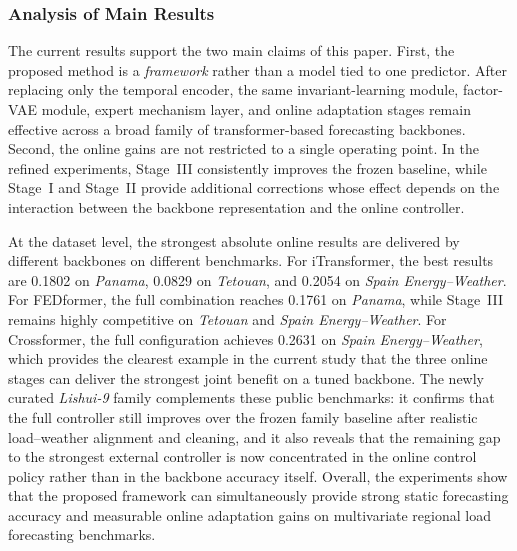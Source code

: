 ﻿\documentclass[journal]{IEEEtran}
\newenvironment{auditproblemblock}{\begingroup\color{red}}{\endgroup}
\begin{document}
\subsubsection{Analysis of Main Results}
\begin{auditproblemblock}
The current results support the two main claims of this paper. First, the proposed method is a \emph{framework} rather than a model tied to one predictor. After replacing only the temporal encoder, the same invariant-learning module, factor-VAE module, expert mechanism layer, and online adaptation stages remain effective across a broad family of transformer-based forecasting backbones. Second, the online gains are not restricted to a single operating point. In the refined experiments, Stage~III consistently improves the frozen baseline, while Stage~I and Stage~II provide additional corrections whose effect depends on the interaction between the backbone representation and the online controller.

At the dataset level, the strongest absolute online results are delivered by different backbones on different benchmarks. For iTransformer, the best results are 0.1802 on \textit{Panama}, 0.0829 on \textit{Tetouan}, and 0.2054 on \textit{Spain Energy--Weather}. For FEDformer, the full combination reaches 0.1761 on \textit{Panama}, while Stage~III remains highly competitive on \textit{Tetouan} and \textit{Spain Energy--Weather}. For Crossformer, the full configuration achieves 0.2631 on \textit{Spain Energy--Weather}, which provides the clearest example in the current study that the three online stages can deliver the strongest joint benefit on a tuned backbone. The newly curated \textit{Lishui-9} family complements these public benchmarks: it confirms that the full controller still improves over the frozen family baseline after realistic load--weather alignment and cleaning, and it also reveals that the remaining gap to the strongest external controller is now concentrated in the online control policy rather than in the backbone accuracy itself. Overall, the experiments show that the proposed framework can simultaneously provide strong static forecasting accuracy and measurable online adaptation gains on multivariate regional load forecasting benchmarks.


\end{auditproblemblock}
\end{document}
